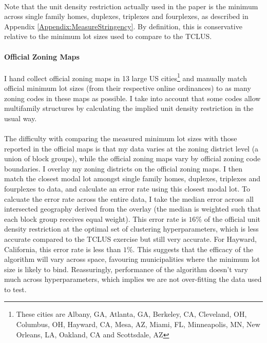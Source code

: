 \documentclass[12pt]{article}
\begin{document}
	\paragraph*{}
	Note that the unit density restriction actually used in the paper is the minimum across single family homes, duplexes, triplexes and fourplexes, as described in Appendix \ref{Appendix:MeasureStringency}. By definition, this is conservative relative to the minimum lot sizes used to compare to the TCLUS.  
	
	\paragraph*{Official Zoning Maps} I hand collect official zoning maps in 13 large US cities\footnote{These cities are Albany, GA, Atlanta, GA, Berkeley, CA, Cleveland, OH, Columbus, OH, Hayward, CA, Mesa, AZ, Miami, FL, Minneapolis, MN, New Orleans, LA, Oakland, CA and Scottsdale, AZ} and manually match official minimum lot sizes (from their respective online ordinances) to as many zoning codes in these maps as possible. I take into account that some codes allow multifamily structures by calculating the implied unit density restriction in the usual way.
	
	\paragraph*{}
	The difficulty with comparing the measured minimum lot sizes with those reported in the official maps is that my data varies at the zoning district level (a union of block groups), while the official zoning maps vary by official zoning code boundaries. I overlay my zoning districts on the official zoning maps. I then match the closest modal lot amongst single family homes, duplexes, triplexes and fourplexes to data, and calculate an error rate using this closest modal lot. To calcuate the error rate across the entire data, I take the median error across all intersected geography derived from the overlay (the median is weighted such that each block group receives equal weight). This error rate is $16 \%$ of the official unit density restriction at the optimal set of clustering hyperparameters, which is less accurate compared to the TCLUS exercise but still very accurate. For Hayward, California, this error rate is less than $1\%$. This suggests that the efficacy of the algorithm will vary across space, favouring municipalities where the minimum lot size is likely to bind. Reassuringly, performance of the algorithm doesn't vary much across hyperparameters, which implies we are not over-fitting the data used to test. 
	
\end{document}
